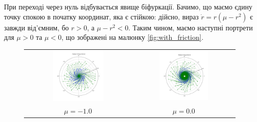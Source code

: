 \documentclass{hw_template}
\begin{document}
При переході через нуль відбувається явище біфуркації. Бачимо, що 
маємо єдину точку спокою в початку координат, яка є стійкою: дійсно, 
вираз $\dot{r} = r(\mu-r^2)$ є завжди від'ємним, бо $r > 0$, а 
$\mu - r^2 < 0$. Таким чином, маємо наступні портрети для $\mu > 0$ та $\mu < 0$, 
що зображені на малюнку \ref{fig:with_friction}.

\begin{figure}
    \begin{tabular}{cc}
      \includegraphics[width=0.5\textwidth]{code/problem_4_-1.0.pdf} &   \includegraphics[width=0.5\textwidth]{code/problem_4_0.0.pdf} \\
      $\mu=-1.0$ & $\mu=0.0$ \\

\end{tabular}
\end{figure}
\end{document}
